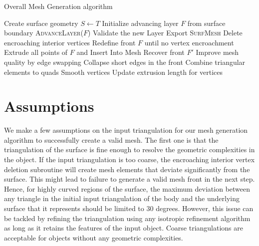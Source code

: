 \begin{algorithm}[hbt!]
\caption{Overall Mesh Generation algorithm}\label{alg:euclid}
\begin{algorithmic}[1]
\State Create surface geometry $S \gets T$
\State Initialize advancing layer $F$ from surface boundary
\State \textsc{AdvanceLayer($F$)}
\State Validate the new Layer
\EndWhile \label{advancing-layer-routine}
\State Export \textsc{SurfMesh}
\EndProcedure
{}
\State Delete encroaching interior vertices
\State Redefine front $F$ until no vertex encroachment 
\State Extrude all points of $F$ and Insert Into Mesh
\State Recover front $F'$ 
\State Improve mesh quality by edge swapping 
\State Collapse short edges in the front
\State Combine triangular elements to quads
\State Smooth vertices
\State Update extrusion length for vertices
\EndProcedure
\end{algorithmic}
\label{algo}
\end{algorithm}

\section{Assumptions}

We make a few assumptions on the input triangulation for our mesh generation algorithm to successfully create a valid mesh. The first one is that the triangulation of the surface is fine enough to resolve the geometric complexities in the object. If the input triangulation is too coarse, the encroaching interior vertex deletion subroutine will create mesh elements that deviate significantly from the surface. This might lead to failure to generate a valid mesh front in the next step. Hence, for highly curved regions of the surface, the maximum deviation between any triangle in the initial input triangulation of the body and the underlying surface that it represents should be limited to 30 degrees. However, this issue can be tackled by refining the triangulation using any isotropic refinement algorithm as long as it retains the features of the input object. Coarse triangulations are acceptable for objects without any geometric complexities.

